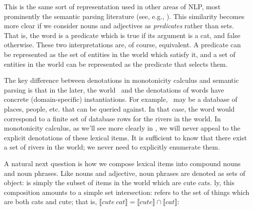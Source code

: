 %
%
This is the same sort of representation used in other areas of NLP, most prominently
  the semantic parsing literature (see, e.g., ).
This similarity becomes more clear if we consider nouns and adjectives as
  \textit{predicates} rather than sets.
That is, the word  is a predicate which is true if its argument is a cat, and false
  otherwise.
These two interpretations are, of course, equivalent.
A predicate can be represented as the set of entities in the world which satisfy it,
  and a set of entities in the world can be represented as the predicate that selects them.

The key difference between denotations in monotonicity calculus and semantic parsing
  is that in the later, the world \sD\ and the denotations of words have concrete
  (domain-specific) instantiations.
For example, \sD\ may be a database of places, people, etc. that can be queried against.
In that case, the word  would correspond to a finite set of database rows
  for the rivers in the world.
In monotonicity calculus, as we'll see more clearly in , we
  will never appeal to the explicit denotations of these lexical items.
It is sufficient to know that there exist a set of rivers in the world; we never need
  to explicitly enumerate them.


%
%
A natural next question is how we compose lexical items into compound nouns 
  and noun phrases.
Like nouns and adjective, noun phrases are denoted as sets of object:
   is simply the subset of items in the world which are cute cats.
\Naive ly, this composition amounts to a simple set intersection: 
  refers to the set of things which are both cats and cute;
  that is, 
  $\llbracket cute~cat \rrbracket = \llbracket cute \rrbracket \cap \llbracket cat \rrbracket$:
  

